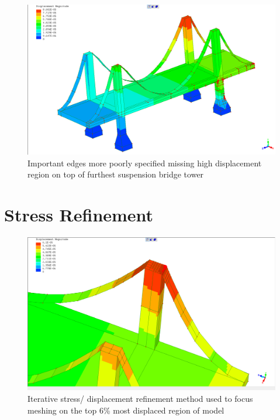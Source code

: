 \begin{figure}[h!!]
  \centerline{\includegraphics[width=165mm, scale=0.5]{../Graphics/BridgeCrossLoading/okEdgeSpecResults.png}}
  \caption{Important edges more poorly specified missing high displacement region on top of furthest suspension bridge tower}
\end{figure}

\section{Stress Refinement}
\begin{figure}[h!!]
  \centerline{\includegraphics[width=165mm, scale=0.5]{../Graphics/BridgeCrossLoading/the90thPercentileRefinement.png}}
  \caption{Iterative stress/ displacement refinement method used to focus meshing on the top 6\% most displaced region of model}
\end{figure}

